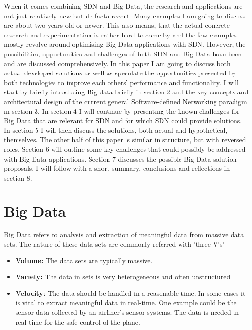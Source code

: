 \documentclass{acm_proc_article-sp}
\begin{document}
When it comes combining SDN and Big Data, the research and applications are not just relatively new but de facto recent. Many examples I am going to discuss are about two years old or newer. This also means, that the actual concrete research and experimentation is rather hard to come by and the few examples mostly revolve around optimising Big Data applications with SDN. However, the possibilities, opportunities and challenges of both SDN and Big Data have been and are discussed comprehensively. In this paper I am going to discuss both actual developed solutions as well as speculate the opportunities presented by both technologies to improve each others' performance and functionality. I will start by briefly introducing Big data briefly in section 2 and the key concepts and architectural design of the current general Software-defined Networking paradigm in section 3. In section 4 I will continue by presenting the known challenges for Big Data that are relevant for SDN and for which SDN could provide solutions. In section 5 I will then discuss the solutions, both actual and hypothetical, themselves. The other half of this paper is similar in structure, but with reversed roles. Section 6 will outline some key challenges that could possibly be addressed with Big Data applications. Section 7 discusses the possible Big Data solution proposals. I will follow with a short summary, conclusions and reflections in section 8.  

\section{Big Data}

Big Data refers to analysis and extraction of meaningful data from massive data sets. The nature of these data sets are commonly referred with 'three V's' \cite{Benjamins:2014:BDH:2611040.2611042}

\begin{itemize}
\item \textbf{Volume: } The data sets are typically massive.
\item \textbf{Variety: } The data in sets is very heterogeneous and often unstructured
\item \textbf{Velocity: } The data should be handled in a reasonable time. In some cases it is vital to extract meaningful data in real-time. One example could be the sensor data collected by an airliner's sensor systems. The data is needed in real time for the safe control of the plane.
\end{itemize}
\end{document}
